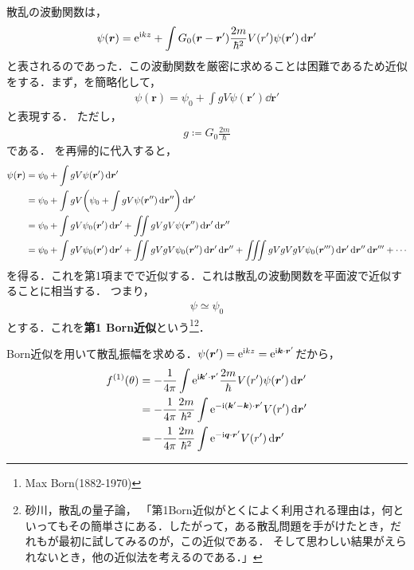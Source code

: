 \documentclass{report}
\begin{document}
  散乱の波動関数は，
  \begin{align}
    \psi(\bm{r}) = \mathrm{e}^{\mathrm{i} kz} + \int G_0 (\bm{r} - \bm{r}') \frac{2m}{\hbar^2} V(r') \psi(\bm{r}') \dd{\bm{r}'}\label{wave-funtion-of-scattering}
  \end{align}
  と表されるのであった．この波動関数を厳密に求めることは困難であるため近似をする．まず，を簡略化して，
  \begin{align}
    \psi(\bm{r}) = \psi_0 + \int g V \psi(\bm{r}') \dd{\bm{r}'}\label{simple-wave-funtion-of-scattering}
  \end{align}
  と表現する．
  ただし，
  \begin{align}
    g \coloneqq G_0\frac{2m}{\hbar}
  \end{align}
  である．
  を再帰的に代入すると，
  \begin{align}
    \psi(\bm{r}) &= \psi_0 + \int g V \psi(\bm{r}') \dd{\bm{r}'}\\
    &= \psi_0 + \int gV \qty(\psi_0 + \int g V \psi(\bm{r}'') \dd{\bm{r}''}) \dd{\bm{r}'}\\
    &= \psi_0 + \int g V \psi_0(\bm{r}') \dd{\bm{r}'} + \iint gVgV \psi(\bm{r}'') \dd{\bm{r}'} \dd{\bm{r}''}\\
    &= \psi_0 + \int g V \psi_0(\bm{r}') \dd{\bm{r}'} + \iint gVgV \psi_0(\bm{r}'') \dd{\bm{r}'} \dd{\bm{r}''} + \iiint gVgVgV \psi_0(\bm{r}''') \dd{\bm{r}'} \dd{\bm{r}''} \dd{\bm{r}'''} + \cdots
  \end{align}
  を得る．これを第1項までで近似する．これは散乱の波動関数を平面波で近似することに相当する．
  つまり，
  \begin{align}
    \psi \simeq \psi_0
  \end{align}
  とする．これを\textbf{第1 Born近似}という\footnote{Max Born(1882-1970)}\footnote{砂川，散乱の量子論，
  「第1Born近似がとくによく利用される理由は，何といってもその簡単さにある．したがって，ある散乱問題を手がけたとき，だれもが最初に試してみるのが，この近似である．
  そして思わしい結果がえられないとき，他の近似法を考えるのである．」}．
  \par
  Born近似を用いて散乱振幅を求める．$\psi(\bm{r}') = \mathrm{e}^{\mathrm{i} kz} = \mathrm{e}^{\mathrm{i} \bm{k}\cdot\bm{r}'}$だから，
  \begin{align}
    f^{(1)}(\theta) &= -\frac{1}{4\pi} \int \mathrm{e}^{\mathrm{i} \bm{k}' \cdot \bm{r}'} \frac{2m}{\hbar} V(r') \psi(\bm{r}') \dd{\bm{r}'}\\
    &= -\frac{1}{4\pi}\frac{2m}{\hbar^2}\int\mathrm{e}^{-\mathrm{i} (\bm{k}' - \bm{k})\cdot \bm{r}'} V(r') \dd{\bm{r}'}\\
    &= -\frac{1}{4\pi}\frac{2m}{\hbar^2}\int\mathrm{e}^{-\mathrm{i} \bm{q}\cdot \bm{r}'} V(r') \dd{\bm{r}'}\label{potential-fourier-transform}
  \end{align}
\end{document}
